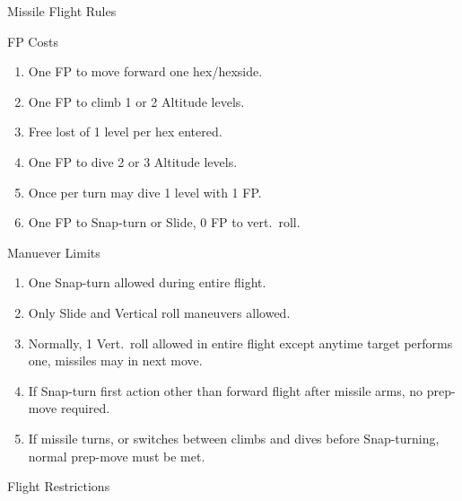 \begin{table}
\centering\small
\caption{Missile Flight Rules}

\medskip
FP Costs
\medskip

\begin{enumerate}
    \item One FP to move forward one hex/hexside.
    \item One FP to climb 1 or 2 Altitude levels.
    \item Free lost of 1 level per hex entered.
    \item One FP to dive 2 or 3 Altitude levels.
    \item Once per turn may dive 1 level with 1 FP.
    \item One FP to Snap-turn or Slide, 0 FP to vert.\ roll.
\end{enumerate}

\medskip

Manuever Limits
\medskip

\begin{enumerate}
    \item One Snap-turn allowed during entire flight.
    \item Only Slide and Vertical roll maneuvers allowed.
    \item Normally, 1 Vert.\ roll allowed in entire flight except anytime target performs one, missiles may in next move.
    \item If Snap-turn first action other than forward flight after missile arms, no prep-move required.
    \item If missile turns, or switches between climbs and dives before Snap-turning, normal prep-move must be met.
\end{enumerate}

\medskip

Flight Restrictions
\medskip


\end{table}
